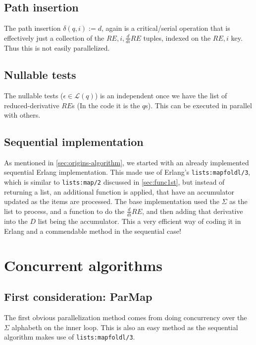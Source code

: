 \documentclass[a4paper,11pt]{report}
\begin{document}
\subsection{Path insertion}
\label{sec:path-insertion}

The path insertion $\delta(q,i):=d$, again is a critical/serial operation
that is effectively just a collection of the $RE,i,\frac{d}{di}RE$
tuples, indexed on the $RE,i$ key. Thus this is not easily parallelized.

\subsection{Nullable tests}
\label{sec:nullable-tests}
The nullable tests ($\epsilon\in \mathcal{L}(q)$) is an independent
once we have the list of reduced-derivative $RE$s (In the code it is
the $q$s). This can be executed in parallel with others.

\subsection{Sequential implementation}
\label{sec:sequ-impl}

As mentioned in \autoref{sec:origins-algorithm}, we started with an
already implemented sequential Erlang implementation. This made use of
Erlang's \texttt{lists:mapfoldl/3}, which is similar to
\texttt{lists:map/2} discussed in \autoref{sec:func1st}, but instead of
returning a list, an additional function is applied, that have an
accumulator updated as the items are processed. The base
implementation used the $\Sigma$ as the list to process, and a
function to do the $\frac{d}{di}RE$, and then adding that derivative
into the $D$ list being the accumulator. This a very efficient way of
coding it in Erlang and a commendable method in the sequential case!

\section{Concurrent algorithms}
\label{sec:conc-algor}

\subsection{First consideration: ParMap}
\label{sec:strausparmap}

The first obvious parallelization method comes from doing concurrency
over the $\Sigma$ alphabeth on the inner loop. This is also an easy method
as the sequential algorithm makes use of \texttt{lists:mapfoldl/3}.
\end{document}
